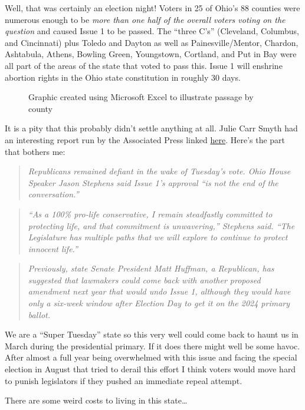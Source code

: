 Well, that was certainly an election night! Voters in 25 of Ohio's 88
counties were numerous enough to be \emph{more than one half of the
overall voters voting on the question} and caused Issue 1 to be passed.
The ``three C's'' (Cleveland, Columbus, and Cincinnati) plus Toledo and
Dayton as well as Painesville/Mentor, Chardon, Ashtabula, Athens,
Bowling Green, Youngstown, Cortland, and Put in Bay were all part of the
areas of the state that voted to pass this. Issue 1 will enshrine
abortion rights in the Ohio state constitution in roughly 30 days.

\begin{figure}
\centering
{}
\caption{Graphic created using Microsoft Excel to illustrate passage by
county}
\end{figure}

It is a pity that this probably didn't settle anything at all. Julie
Carr Smyth had an interesting report run by the Associated Press linked
\href{https://web.archive.org/web/20231108033900/https://apnews.com/article/ohio-abortion-amendment-election-2023-fe3e06747b616507d8ca21ea26485270}{here}.
Here's the part that bothers me:

\begin{quote}
\emph{Republicans remained defiant in the wake of Tuesday's vote. Ohio
House Speaker Jason Stephens said Issue 1's approval ``is not the end of
the conversation.''}
\end{quote}

\begin{quote}
\emph{``As a 100\% pro-life conservative, I remain steadfastly committed
to protecting life, and that commitment is unwavering,'' Stephens said.
``The Legislature has multiple paths that we will explore to continue to
protect innocent life.''}
\end{quote}

\begin{quote}
\emph{Previously, state Senate President Matt Huffman, a Republican, has
suggested that lawmakers could come back with another proposed amendment
next year that would undo Issue 1, although they would have only a
six-week window after Election Day to get it on the 2024 primary
ballot.}
\end{quote}

We are a ``Super Tuesday'' state so this very well could come back to
haunt us in March during the presidential primary. If it does there
might well be some havoc. After almost a full year being overwhelmed
with this issue and facing the special election in August that tried to
derail this effort I think voters would move hard to punish legislators
if they pushed an immediate repeal attempt.

There are some weird costs to living in this state\ldots{}
